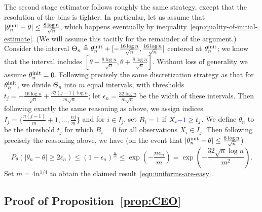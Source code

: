 The second stage estimator follows roughly the same strategy, except that
the resolution of the bins is tighter. In particular, let us assume that
$|\theta_n^{\textup{init}} - \theta| \le \frac{8 \log n}{\sqrt{n}}$, which happens
eventually by inequality~\eqref{eqn:quality-of-initial-estimate}.  (We will
assume this tacitly for the remainder of the argument.)  Consider the
interval $\Theta_n \triangleq \theta_n^{\textup{init}} + [-\frac{16 \log n}{\sqrt{n}},
  \frac{16 \log n}{\sqrt{n}}]$ centered at $\theta_n^{\textup{init}}$; we know that the
interval includes $[\theta - \frac{8 \log n}{\sqrt{n}}, \theta + \frac{8
    \log n}{\sqrt{n}}]$. Without loss of generality we assume $\theta_n^{\textup{init}}
= 0$.  Following precisely the same discretization strategy as that for
$\theta_n^{\textup{init}}$, we divide $\Theta_n$ into $m$ equal intervals, with
thresholds $t_j = -\frac{16 \log n}{\sqrt{n}} + \frac{32 (j - 1) \log n}{m
  \sqrt{n}}$; let $\epsilon_n = \frac{32 \log n}{m \sqrt{n}}$ be the width of
these intervals.  Then following exactly the same reasoning as above, we
assign indices $I_j = \{\frac{n(j - 1)}{m} + 1, \ldots, \frac{n j}{m}\}$ and
for $i \in I_j$, set $B_i = 1$ if $X_i {\color{blue} {- 1}} \ge t_j$. We define $\theta_n$ to be
the  threshold $t_j$ for which $B_i = 0$ for all observations $X_i
\in I_j$. Then following precisely the reasoning above, we have (on the
event that $|\theta_n^{\textup{init}} - \theta| \le \frac{8 \log n}{\sqrt{n}}$)
\begin{equation*}
  P_\theta(|\theta_n - \theta|
  \ge 2 \epsilon_n)
  \le (1 - \epsilon_n)^\frac{n}{m}
  \le \exp\left(-\frac{n \epsilon_n}{m}\right)
  = \exp\left(-\frac{32 \sqrt{n} \log n}{m^2}\right).
\end{equation*}
Set $m = 4 n^{1/4}$ to obtain the claimed
result~\eqref{eqn:uniforms-are-easy}.



\subsection{Proof of Proposition~\ref{prop:CEO}
\label{app:proof:CEO}}

